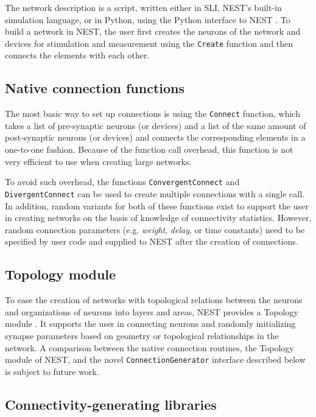 \documentclass{frontiersSCNS} %
\begin{document}
The network description is a script, written either in SLI, NEST's
built-in simulation language, or in Python, using the Python interface
to NEST \citep[PyNEST;][]{Eppler09_12}. To build a network in NEST,
the user first creates the neurons of the network and devices for
stimulation and measurement using the \verb|Create| function and then
connects the elements with each other.

\subsection{Native connection functions}

The most basic way to set up connections is using the \verb|Connect|
function, which takes a list of pre-synaptic neurons (or devices) and
a list of the same amount of post-synaptic neurons (or devices) and
connects the corresponding elements in a one-to-one fashion. Because
of the function call overhead, this function is not very efficient to
use when creating large networks.

To avoid such overhead, the functions \verb|ConvergentConnect| and
\verb|DivergentConnect| can be used to create multiple connections
with a single call. In addition, random variants for both of these
functions exist to support the user in creating networks on the basis
of knowledge of connectivity statistics. However, random connection
parameters (e.g. \emph{weight}, \emph{delay}, or time constants) need
to be specified by user code and supplied to NEST after the creation
of connections.

\subsection{Topology module}

To ease the creation of networks with topological relations between
the neurons and organizations of neurons into layers and areas, NEST
provides a Topology module \citep{Plesser_13}. It supports the user in
connecting neurons and randomly initializing synapse parameters based
on geometry or topological relationships in the network. A comparison
between the native connection routines, the Topology module of NEST,
and the novel \verb|ConnectionGenerator| interface described below is
subject to future work.

\subsection{Connectivity-generating libraries}
\end{document}
